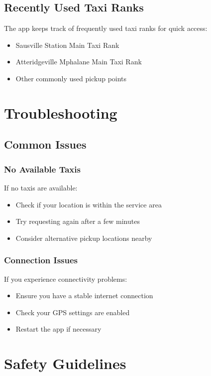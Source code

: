 \documentclass[12pt]{article}
\begin{document}
\subsection{Recently Used Taxi Ranks}
The app keeps track of frequently used taxi ranks for quick access:
\begin{itemize}
    \item Sausville Station Main Taxi Rank
    \item Atteridgeville Mphalane Main Taxi Rank
    \item Other commonly used pickup points
\end{itemize}

\section{Troubleshooting}

\subsection{Common Issues}
\subsubsection{No Available Taxis}
If no taxis are available:
\begin{itemize}
    \item Check if your location is within the service area
    \item Try requesting again after a few minutes
    \item Consider alternative pickup locations nearby
\end{itemize}

\subsubsection{Connection Issues}
If you experience connectivity problems:
\begin{itemize}
    \item Ensure you have a stable internet connection
    \item Check your GPS settings are enabled
    \item Restart the app if necessary
\end{itemize}


\section{Safety Guidelines}
\end{document}
